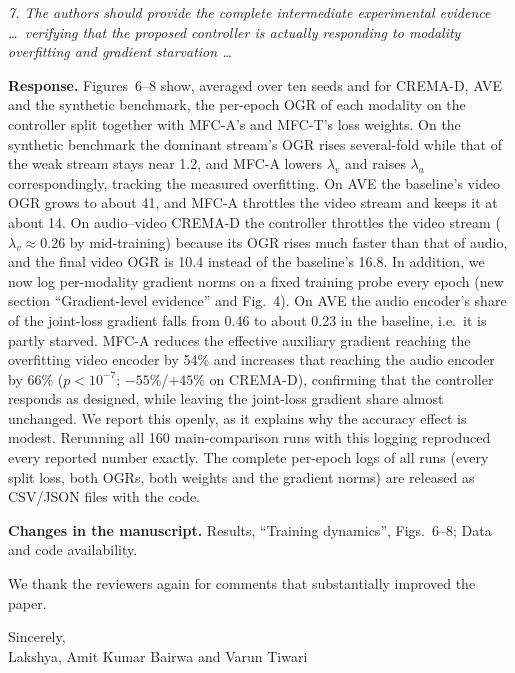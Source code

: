 \documentclass[11pt,a4paper]{article}
\newcommand{\rc}[1]{\par\noindent\colorbox{gray!12}{\parbox{\dimexpr\linewidth-2\fboxsep}{\small\textit{#1}}}\par}
\newcommand{\resp}{\par\noindent\textbf{Response.} }
\newcommand{\chg}{\par\noindent\textbf{Changes in the manuscript.} }
\begin{document}
\rc{7. The authors should provide the complete intermediate experimental evidence \ldots\ verifying that the proposed controller is actually responding to modality overfitting and gradient starvation \ldots}
\resp Figures~6--8 show, averaged over ten seeds and for CREMA-D, AVE and the synthetic benchmark, the per-epoch OGR of each modality on the controller split together with MFC-A's and MFC-T's loss weights. On the synthetic benchmark the dominant stream's OGR rises several-fold while that of the weak stream stays near 1.2, and MFC-A lowers $\lambda_v$ and raises $\lambda_a$ correspondingly, tracking the measured overfitting. On AVE the baseline's video OGR grows to about 41, and MFC-A throttles the video stream and keeps it at about 14. On audio--video CREMA-D the controller throttles the video stream ($\lambda_v\approx0.26$ by mid-training) because its OGR rises much faster than that of audio, and the final video OGR is 10.4 instead of the baseline's 16.8. In addition, we now log per-modality gradient norms on a fixed training probe every epoch (new section ``Gradient-level evidence'' and Fig.~4). On AVE the audio encoder's share of the joint-loss gradient falls from 0.46 to about 0.23 in the baseline, i.e.\ it is partly starved. MFC-A reduces the effective auxiliary gradient reaching the overfitting video encoder by 54\% and increases that reaching the audio encoder by 66\% ($p<10^{-7}$; $-55\%$/$+45\%$ on CREMA-D), confirming that the controller responds as designed, while leaving the joint-loss gradient share almost unchanged. We report this openly, as it explains why the accuracy effect is modest. Rerunning all 160 main-comparison runs with this logging reproduced every reported number exactly. The complete per-epoch logs of all runs (every split loss, both OGRs, both weights and the gradient norms) are released as CSV/JSON files with the code.
\chg Results, ``Training dynamics'', Figs.~6--8; Data and code availability.

\bigskip
We thank the reviewers again for comments that substantially improved the paper.

Sincerely,\\
Lakshya, Amit Kumar Bairwa and Varun Tiwari
\end{document}
